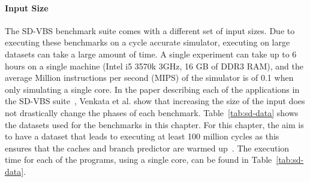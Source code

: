 \paragraph*{Input Size}
The SD-VBS benchmark suite comes with a different set of input sizes.
Due to executing these benchmarks on a cycle accurate simulator, executing on large datasets can take a large amount of time.
A single experiment can take up to 6 hours on a single machine (Intel i5 3570k 3GHz, 16 GB of DDR3 RAM), and the average Million instructions per second (MIPS) of the simulator is of 0.1 when only simulating a single core.
In the paper describing each of the applications in the SD-VBS suite~\cite{sdvbs}, Venkata et al. show that increasing the size of the input does not drastically change the phases of each benchmark.
Table~\ref{tab:sd-data} shows the datasets used for the benchmarks in this chapter.
For this chapter, the aim is to have a dataset that leads to executing at least 100 million cycles as this ensures that the caches and branch predictor are warmed up~\cite{dubach13dynamic}.
The execution time for each of the programs, using a single core, can be found in Table~\ref{tab:sd-data}.






